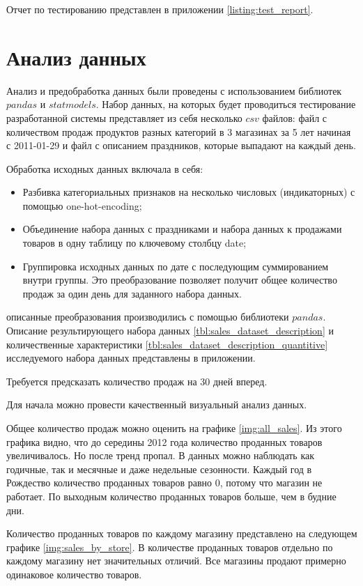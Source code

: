Отчет по тестированию представлен в приложении \ref{listing:test_report}.

\section{Анализ данных}

Анализ и предобработка данных были проведены с использованием
библиотек $ pandas $ и $ statmodels $.
Набор данных, на которых будет проводиться тестирование разработанной системы
представляет из себя несколько $ csv $ файлов: файл с количеством продаж
продуктов разных категорий в 3 магазинах за 5 лет начиная с 2011-01-29
и файл с описанием праздников, которые выпадают на каждый день.

Обработка исходных данных включала в себя:

\begin{itemize}
	\item Разбивка категориальных признаков на несколько числовых (индикаторных) с помощью one-hot-encoding; %
	\item Объединение набора данных с праздниками и набора данных к продажами товаров в одну таблицу по ключевому столбцу date;
	\item Группировка исходных данных по дате с последующим суммированием  внутри группы. Это преобразование
	позволяет получит общее количество продаж за один день для заданного набора данных.
\end{itemize}

\noindent описанные преобразования производились с помощью библиотеки $ pandas $.
Описание результирующего набора данных \ref{tbl:sales_dataset_description}
и количественные характеристики \ref{tbl:sales_dataset_description_quantitive}
исследуемого набора данных представлены в приложении.

Требуется предсказать количество продаж на 30 дней вперед.

Для начала можно провести качественный визуальный анализ данных.

Общее количество продаж можно оценить на графике \ref{img:all_sales}.
Из этого графика видно, что до середины 2012 года количество проданных
товаров увеличивалось. Но после тренд пропал. В данных можно наблюдать
как годичные, так и месячные и даже недельные сезонности. Каждый год
в Рождество количество проданных товаров равно 0, потому что магазин не работает.
По выходным количество проданных товаров больше, чем в будние дни.

Количество проданных товаров по каждому магазину представлено на следующем графике \ref{img:sales_by_store}.
В количестве проданных товаров отдельно по каждому магазину нет значительных отличий.
Все магазины продают примерно одинаковое количество товаров.

